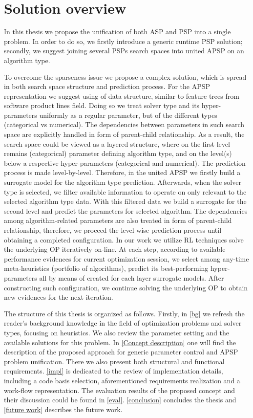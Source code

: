 \section{Solution overview}
In this thesis we propose the unification of both ASP and PSP into a single problem. In order to do so, we firstly introduce a generic runtime PSP solution; secondly, we suggest joining several PSPs search spaces into united APSP on an algorithm type.

To overcome the sparseness issue we propose a complex solution, which is spread in both search space structure and prediction process. For the APSP representation we suggest using of data structure, similar to feature trees from software product lines field. Doing so we treat solver type and its hyper-parameters uniformly as a regular parameter, but of the different types (categorical vs numerical). The dependencies between parameters in such search space are explicitly handled in form of parent-child relationship. As a result, the search space could be viewed as a layered structure, where on the first level remains (categorical) parameter defining algorithm type, and on the level(s) below a respective hyper-parameters (categorical and numerical). The prediction process is made level-by-level. Therefore, in the united APSP we firstly build a surrogate model for the algorithm type prediction. Afterwards, when the solver type is selected, we filter available information to operate on only relevant to the selected algorithm type data. With this filtered data we build a surrogate for the second level and predict the parameters for selected algorithm. The dependencies among algorithm-related parameters are also treated in form of parent-child relationship, therefore, we proceed the level-wise prediction process until obtaining a completed configuration. In our work we utilize RL techniques solve the underlying OP iteratively on-line. At each step, according to available performance evidences for current optimization session, we select among any-time meta-heuristics (portfolio of algorithms), predict its best-performing hyper-parameters all by means of created for each layer surrogate models. After constructing such configuration, we continue solving the underlying OP to obtain new evidences for the next iteration.

The structure of this thesis is organized as follows. Firstly, in \cref{bg} we refresh the reader's background knowledge in the field of optimization problems and solver types, focusing on heuristics. We also review the parameter setting and the available solutions for this problem. In \cref{Concept description} one will find the description of the proposed approach for generic parameter control and APSP problem unification. There we also present both structural and functional requirements. \cref{impl} is dedicated to the review of implementation details, including a code basis selection, aforementioned requirements realization and a work-flow representation. The evaluation results of the proposed concept and their discussion could be found in \cref{eval}. \cref{conclusion} concludes the thesis and \cref{future work} describes the future work.

